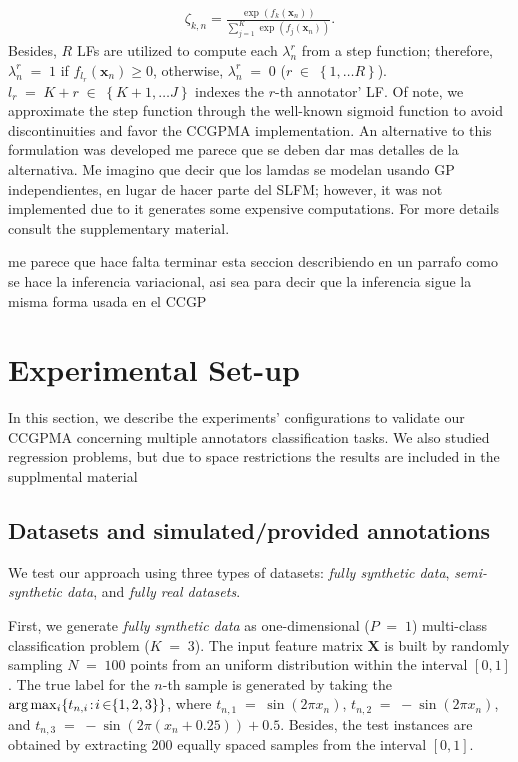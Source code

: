 \documentclass[journal]{IEEEtran}
\providecommand{\ve}[1]{{\bm{#1}}}%
\providecommand{\mat}[1]{{\bm{#1}}} %
\DeclareMathOperator{\en}{\!\,\in\!\,}
\DeclareMathOperator{\igual}{\!\,=\!\,}
\providecommand{\s}[1]{\negthinspace#1\negthinspace}%
\providecommand{\ve}[1]{{\mathbf{#1}}}
\providecommand{\mat}[1]{{\mathbf{#1}}}
\newcommand{\comment}[2]{{\color{blue}#1} {\color{red}#2}}
\begin{document}
\begin{align}
\zeta_{k,n} = \frac{\exp(f_k(\ve{x}_n))}{\sum_{j=1}^{K}\exp(f_j(\ve{x}_n))}.
\end{align}
Besides, $R$ LFs are utilized to compute each ${\lambda}_n^r$ from a
step function; therefore, ${\lambda}_n^r\igual 1$ if
$f_{l_r}(\ve{x}_n)\geq 0$, otherwise, ${\lambda}_n^r\igual 0$  ($r\en
\left\{1, \dots R\right\}$). $l_r \igual K+r \en \left\{K+1, \dots
  J\right\}$ indexes the $r$-th annotator' LF. Of note, we approximate
the step function through the well-known sigmoid function to avoid
discontinuities and favor the CCGPMA implementation. \comment{An
  alternative to this formulation was developed}{me parece que se
  deben dar mas detalles de la alternativa. Me imagino que decir que
  los lamdas se modelan usando GP independientes, en lugar de hacer
  parte del SLFM}; however, it was not implemented due to it generates some expensive computations. For more details consult the supplementary material.

\comment{}{me parece que hace falta terminar esta seccion describiendo
en un parrafo como se hace la inferencia variacional, asi sea para
decir que la inferencia sigue la misma forma usada en el CCGP}

\section{Experimental Set-up}\label{sec:expsetup}
In this section, we describe the experiments' configurations
to validate our CCGPMA concerning multiple annotators classification
tasks. \comment{}{We also studied regression problems, but due to
  space restrictions the results are included in the supplmental material}

\subsection{Datasets and simulated/provided annotations}\label{sec:datasets}
We test our approach using three types of datasets:  \textit{fully synthetic data}, \textit{semi-synthetic data}, and \textit{fully real datasets}. 

First, we generate \textit{fully synthetic data} as one-dimensional ($P\igual1$) multi-class classification problem ($K\igual3$). The input feature matrix $\mat{X}$ is built by randomly sampling $N\igual100$ points from an uniform distribution within the interval $[0,1]$. The true label for the $n$-th sample is generated by taking the $\arg \max_i \{t_{n,i}\s{:}i\en\{1,2,3\}\}$, where $t_{n,1}\igual\sin(2\pi{x}_n)$, $t_{n,2}\igual-\sin(2\pi{x}_n)$, and $t_{n,3}\igual-\sin(2\pi({x}_n+0.25))+0.5$. Besides, the test instances are obtained by extracting $200$ equally spaced samples from the interval $[0,1]$.
\end{document}
